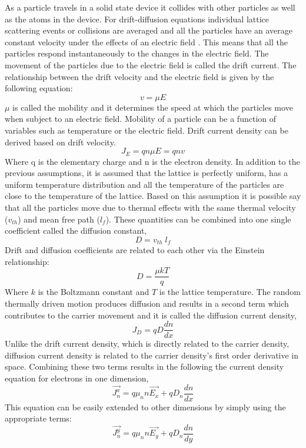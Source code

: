 \begin{doublespace}
As a particle travels in a solid state device it collides with other particles as well as the atoms in the device. For  drift-diffusion equations individual lattice scattering events or collisions are averaged and all the particles have an average constant  velocity under the effects of an electric field \cite{snowden}. This means that all the particles respond instantaneously to the changes in the electric field. The movement of the particles due to the electric field is called the drift current. The relationship between the drift velocity and the electric field is given by the following equation:
\begin{equation}
v=\mu E
\end{equation}
$\mu$ is called the mobility and it determines the  speed at which the particles  move when subject to an electric field. Mobility of a particle can be a function of  variables such as temperature or the electric field. Drift current density can be derived based on  drift velocity\cite{snowden}.
\begin{equation}
J_E=q n\mu E=q n v 
\end{equation}
Where q is the elementary charge and n is the electron density. In addition to the previous assumptions, it is assumed that the lattice is perfectly uniform, has a uniform temperature distribution and all the temperature of the particles are close to the temperature of the lattice. Based on this assumption it is possible say that all the particles move due to thermal effects with the same thermal velocity ($v_{th}$) and mean free path ($l_f$). These quantities can be combined into one single coefficient called the diffusion constant,
\begin{equation}
D=v_{th} \;l_f
\end{equation}
 Drift and diffusion coefficients are related to each other via the Einstein relationship\cite{snowden}:
\begin{equation}
D=\frac{\mu k T}{q}
\end{equation}
Where $k$ is the Boltzmann constant and $T$ is the lattice temperature. The random thermally driven motion produces diffusion and results in a second term which contributes to the carrier movement and it is called the diffusion current density,
\begin{equation}
J_D=qD\frac{dn}{dx}
\end{equation}
Unlike the drift current density, which is directly related to the carrier density, diffusion current density is related to the carrier density's first order derivative in space. Combining these two terms results in the following the current density equation for electrons in one dimension,
\begin{equation}
\vec{J_n^x}=q \mu_{n} n \vec{E_x}+qD_{n} \frac{dn}{dx} 
\label{cdenn}
\end{equation}
This equation can be easily extended to other dimensions by simply using the appropriate terms:
\begin{equation}
\vec{J_n^y}=q \mu_{n} n \vec{E_y}+qD_{n} \frac{dn}{dy} 
\end{equation}


\end{doublespace}
